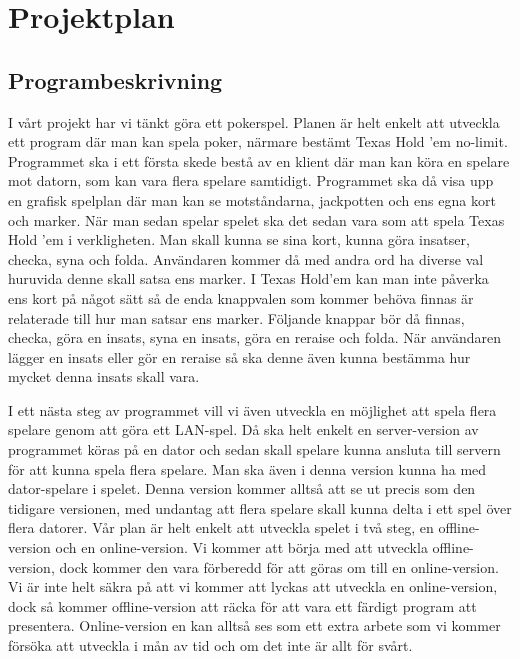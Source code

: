 \documentclass[10pt,twoside,a4paper]{article}
\begin{document}
\section*{Projektplan}

\subsection*{Programbeskrivning}

I vårt projekt har vi tänkt göra ett pokerspel. Planen är helt enkelt att
utveckla ett program där man kan spela poker, närmare bestämt Texas Hold
’em no-limit. Programmet ska i ett första skede bestå av en klient där man
kan köra en spelare mot datorn, som kan vara flera spelare samtidigt.
Programmet ska då visa upp en grafisk spelplan där man kan se motståndarna,
jackpotten och ens egna kort och marker. När man sedan spelar spelet ska
det sedan vara som att spela Texas Hold ’em i verkligheten. Man skall kunna
se sina kort, kunna göra insatser, checka, syna och folda. Användaren
kommer då med andra ord ha diverse val huruvida denne skall satsa ens
marker. I Texas Hold’em kan man inte påverka ens kort på något sätt så de
enda knappvalen som kommer behöva finnas är relaterade till hur man satsar
ens marker. Följande knappar bör då finnas, checka, göra en insats, syna en
insats, göra en reraise och folda. När användaren lägger en insats eller
gör en reraise så ska denne även kunna bestämma hur mycket denna insats
skall vara.

I ett nästa steg av programmet vill vi även utveckla en möjlighet att spela
flera spelare genom att göra ett LAN-spel. Då ska helt enkelt en
server-version av programmet köras på en dator och sedan skall spelare
kunna ansluta till servern för att kunna spela flera spelare. Man ska även
i denna version kunna ha med dator-spelare i spelet. Denna version kommer
alltså att se ut precis som den tidigare versionen, med undantag att flera
spelare skall kunna delta i ett spel över flera datorer. Vår plan är helt
enkelt att utveckla spelet i två steg, en offline-version och en
online-version. Vi kommer att börja med att utveckla offline-version, dock
kommer den vara förberedd för att göras om till en online-version. Vi är
inte helt säkra på att vi kommer att lyckas att utveckla en online-version,
dock så kommer offline-version att räcka för att vara ett färdigt program
att presentera. Online-version en kan alltså ses som ett extra arbete som
vi kommer försöka att utveckla i mån av tid och om det inte är allt för
svårt.
\end{document}
